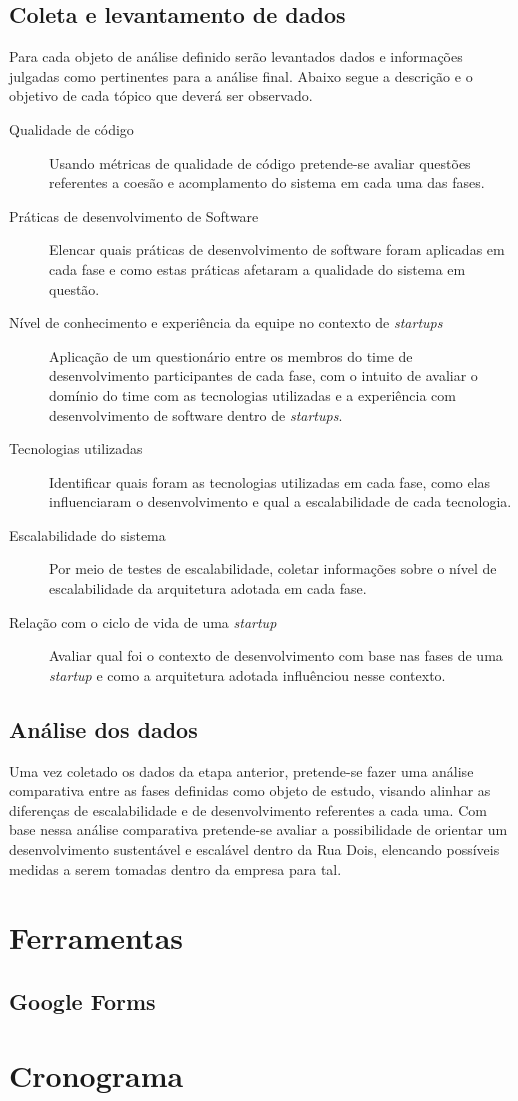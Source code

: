 \subsection{Coleta e levantamento de dados}

Para cada objeto de análise definido serão levantados dados e informações julgadas
como pertinentes para a análise final. Abaixo segue a descrição e o objetivo de
cada tópico que deverá ser observado.

    \begin{description}
        \item [Qualidade de código] Usando métricas de qualidade de código pretende-se
        avaliar questões referentes a coesão e acomplamento do sistema em cada uma das
        fases.
        \item [Práticas de desenvolvimento de Software] Elencar quais práticas de
        desenvolvimento de software foram aplicadas em cada fase e como estas práticas
        afetaram a qualidade do sistema em questão.
        \item [Nível de conhecimento e experiência da equipe no contexto de \textit{startups}]
        Aplicação de um questionário entre os membros do time de desenvolvimento participantes
        de cada fase, com o intuito de avaliar o domínio do time com as tecnologias utilizadas
        e a experiência com desenvolvimento de software dentro de \textit{startups}.
        \item [Tecnologias utilizadas] Identificar quais foram as tecnologias utilizadas em
        cada fase, como elas influenciaram o desenvolvimento e qual a escalabilidade de cada
        tecnologia.
        \item [Escalabilidade do sistema] Por meio de testes de escalabilidade, coletar
        informações sobre o nível de escalabilidade da arquitetura adotada em cada fase.
        \item [Relação com o ciclo de vida de uma \textit{startup}] Avaliar qual foi o
        contexto de desenvolvimento com base nas fases de uma \textit{startup} e como a
        arquitetura adotada influênciou nesse contexto.
    \end{description}

\subsection{Análise dos dados}

Uma vez coletado os dados da etapa anterior, pretende-se fazer uma análise comparativa
entre as fases definidas como objeto de estudo, visando alinhar as diferenças de
escalabilidade e de desenvolvimento referentes a cada uma. Com base nessa análise
comparativa pretende-se avaliar a possibilidade de orientar um desenvolvimento
sustentável e escalável dentro da Rua Dois, elencando possíveis medidas a serem
tomadas dentro da empresa para tal.

\section{Ferramentas}

\subsection{Google Forms}

\section{Cronograma}

